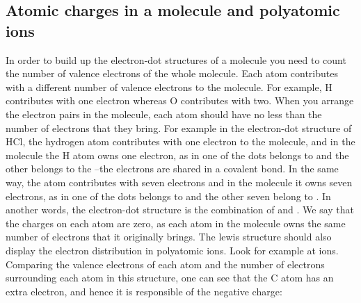 \documentclass[main.tex]{subfiles}
\begin{document}
\subsection*{Atomic charges in a molecule and polyatomic ions}
In order to build up the electron-dot structures of a molecule you need to count the number of valence electrons of the whole molecule. Each atom contributes with a different number of valence electrons to the molecule. For example, H contributes with one electron whereas O contributes with two. When you arrange the electron pairs in the molecule, each atom should have no less than the number of electrons that they bring. For example in the electron-dot structure of HCl, \hspace{.05in}\hspace{.05in} the hydrogen atom contributes with one electron to the molecule, and in the molecule the H atom owns one electron, as in \hspace{.05in}\hspace{.05in}  one of the dots belongs to  and the other belongs to the --the electrons are shared in a covalent bond. In the same way, the  atom contributes with seven electrons and in the molecule it owns seven electrons, as in \hspace{.05in} one of the dots belongs to  and the other seven belong to . In another words, the \hspace{.05in}\hspace{.05in} electron-dot structure is the combination of \hspace{.05in} and \hspace{.05in}\hspace{.05in}. We say that the charges on each atom are zero, as each atom in the molecule owns the same number of electrons that it originally brings. The lewis structure should also display the electron distribution in polyatomic ions. Look for example at  ions. Comparing the valence electrons of each atom and the number of electrons surrounding each atom in this structure, one can see that the C atom has an extra electron, and hence it is responsible of the negative charge:
\begin{center}
\end{center}
\end{document}

